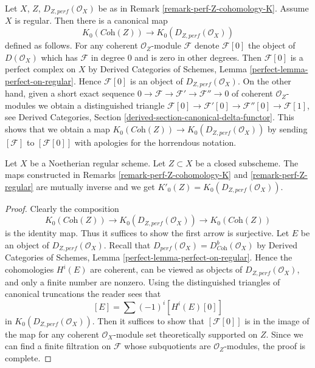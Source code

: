 \begin{remark}
\label{remark-perf-Z-regular}
Let $X$, $Z$, $D_{Z, perf}(\mathcal{O}_X)$ be as in
Remark \ref{remark-perf-Z-cohomology-K}. Assume $X$ is regular.
Then there is a canonical map
$$
K_0(\textit{Coh}(Z)) \longrightarrow K_0(D_{Z, perf}(\mathcal{O}_X))
$$
defined as follows. For any coherent $\mathcal{O}_Z$-module
$\mathcal{F}$ denote $\mathcal{F}[0]$ the object of $D(\mathcal{O}_X)$
which has $\mathcal{F}$ in degree $0$ and is zero in other degrees.
Then $\mathcal{F}[0]$ is a perfect complex on $X$ by
Derived Categories of Schemes, Lemma \ref{perfect-lemma-perfect-on-regular}.
Hence $\mathcal{F}[0]$ is an object of $D_{Z, perf}(\mathcal{O}_X)$.
On the other hand, given a short exact sequence
$0 \to \mathcal{F} \to \mathcal{F}' \to \mathcal{F}'' \to 0$ of
coherent $\mathcal{O}_Z$-modules we obtain a distinguished triangle
$\mathcal{F}[0] \to \mathcal{F}'[0] \to \mathcal{F}''[0] \to \mathcal{F}[1]$,
see Derived Categories, Section \ref{derived-section-canonical-delta-functor}.
This shows that we obtain a map
$K_0(\textit{Coh}(Z)) \to K_0(D_{Z, perf}(\mathcal{O}_X))$
by sending $[\mathcal{F}]$ to $[\mathcal{F}[0]]$
with apologies for the horrendous notation.
\end{remark}

\begin{lemma}
\label{lemma-perf-Z-regular}
Let $X$ be a Noetherian regular scheme.
Let $Z \subset X$ be a closed subscheme. The maps constructed
in Remarks \ref{remark-perf-Z-cohomology-K} and
\ref{remark-perf-Z-regular} are mutually inverse and we get
$K'_0(Z) = K_0(D_{Z, perf}(\mathcal{O}_X))$.
\end{lemma}

\begin{proof}
Clearly the composition
$$
K_0(\textit{Coh}(Z)) \longrightarrow
K_0(D_{Z, perf}(\mathcal{O}_X)) \longrightarrow
K_0(\textit{Coh}(Z))
$$
is the identity map. Thus it suffices to show the first arrow is
surjective. Let $E$ be an object of $D_{Z, perf}(\mathcal{O}_X)$.
Recall that $D_{perf}(\mathcal{O}_X) = D^b_{\textit{Coh}}(\mathcal{O}_X)$
by Derived Categories of Schemes, Lemma
\ref{perfect-lemma-perfect-on-regular}.
Hence the cohomologies $H^i(E)$ are coherent, can be viewed
as objects of $D_{Z, perf}(\mathcal{O}_X)$, and only a finite number
are nonzero. Using the distinguished triangles of canonical truncations the
reader sees that
$$
[E] = \sum (-1)^i[H^i(E)[0]]
$$
in $K_0(D_{Z, perf}(\mathcal{O}_X))$. Then it suffices to
show that $[\mathcal{F}[0]]$ is in the image of the map
for any coherent $\mathcal{O}_X$-module set theoretically
supported on $Z$. Since we can find a finite filtration on
$\mathcal{F}$ whose subquotients are $\mathcal{O}_Z$-modules,
the proof is complete.
\end{proof}

